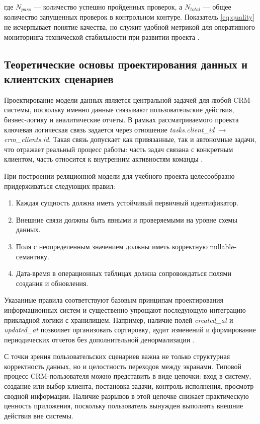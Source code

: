 где $N_{pass}$ --- количество успешно пройденных проверок, а $N_{total}$ --- общее количество запущенных проверок в контрольном контуре. Показатель \eqref{eq:quality} не исчерпывает понятие качества, но служит удобной метрикой для оперативного мониторинга технической стабильности при развитии проекта \cite{testingBook}.

\subsection{Теоретические основы проектирования данных и клиентских сценариев}

Проектирование модели данных является центральной задачей для любой CRM-системы, поскольку именно данные связывают пользовательские действия, бизнес-логику и аналитические отчеты. В рамках рассматриваемого проекта ключевая логическая связь задается через отношение \textit{tasks.client\_id $\rightarrow$ crm\_clients.id}. Такая связь допускает как привязанные, так и автономные задачи, что отражает реальный процесс работы: часть задач связана с конкретным клиентом, часть относится к внутренним активностям команды \cite{repoReadme,migrationClientId}.

При построении реляционной модели для учебного проекта целесообразно придерживаться следующих правил:
\begin{enumerate}
  \item Каждая сущность должна иметь устойчивый первичный идентификатор.
  \item Внешние связи должны быть явными и проверяемыми на уровне схемы данных.
  \item Поля с неопределенным значением должны иметь корректную nullable-семантику.
  \item Дата-время в операционных таблицах должна сопровождаться полями создания и обновления.
\end{enumerate}

Указанные правила соответствуют базовым принципам проектирования информационных систем и существенно упрощают последующую интеграцию прикладной логики с хранилищем. Например, наличие полей \textit{created\_at} и \textit{updated\_at} позволяет организовать сортировку, аудит изменений и формирование периодических отчетов без дополнительной денормализации \cite{dbBook2021,postgresDocs}.

С точки зрения пользовательских сценариев важна не только структурная корректность данных, но и целостность переходов между экранами. Типовой процесс CRM-пользователя можно представить в виде цепочки: вход в систему, создание или выбор клиента, постановка задачи, контроль исполнения, просмотр сводной информации. Наличие разрывов в этой цепочке снижает практическую ценность приложения, поскольку пользователь вынужден выполнять внешние действия вне системы.

